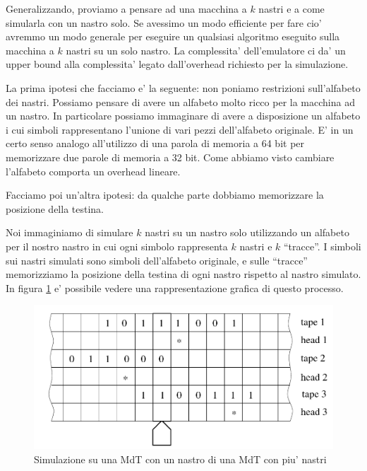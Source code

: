 



Generalizzando, proviamo a pensare ad una macchina a $k$ nastri e a come simularla con un nastro
solo. Se avessimo un modo efficiente per fare cio' avremmo un modo generale per eseguire un qualsiasi
algoritmo eseguito sulla macchina a $k$ nastri su un solo nastro. La complessita' dell'emulatore ci
da' un upper bound alla complessita' legato dall'overhead richiesto per la simulazione.

La prima ipotesi che facciamo e' la seguente: non poniamo restrizioni sull'alfabeto dei nastri.
Possiamo pensare di avere un alfabeto molto ricco per la macchina ad un nastro. In particolare
possiamo immaginare di avere a disposizione un alfabeto i cui simboli rappresentano l'unione di vari
pezzi dell'alfabeto originale. E' in un certo senso analogo all'utilizzo di una parola di memoria a
64 bit per memorizzare due parole di memoria a 32 bit. Come abbiamo visto cambiare l'alfabeto
comporta un overhead lineare.

Facciamo poi un'altra ipotesi: da qualche parte dobbiamo memorizzare la posizione della testina.

Noi immaginiamo di simulare $k$ nastri su un nastro solo utilizzando un alfabeto per il nostro
nastro in cui ogni simbolo rappresenta $k$ nastri e $k$ ``tracce''. I simboli sui nastri simulati
sono simboli dell'alfabeto originale, e sulle ``tracce'' memorizziamo la posizione della testina di
ogni nastro rispetto al nastro simulato. In figura \ref{img:KTapesToOne} e' possibile vedere una rappresentazione
grafica di questo processo.

\begin{figure}[h]
    \begin{center}
        \includegraphics[scale=0.3]{./img/deterministic_complexity_classes/KTapesToOne.png}    
        \caption{Simulazione su una MdT con un nastro di una MdT con piu' nastri}
        \label{img:KTapesToOne}
    \end{center}
\end{figure}

